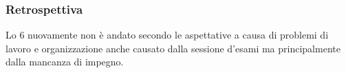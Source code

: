 \subsubsection{Retrospettiva}
\label{sec:sprint6_retrospettiva}
Lo  6 nuovamente non è andato secondo le aspettative a causa di problemi di lavoro e organizzazione anche causato dalla sessione d'esami ma principalmente dalla mancanza di impegno.\\